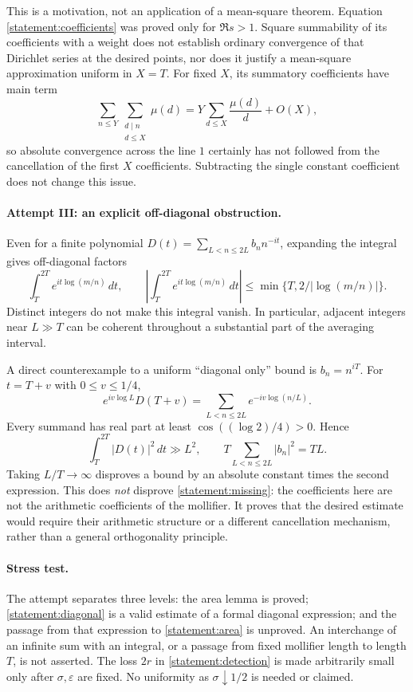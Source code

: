 \documentclass[11pt,a4paper]{article}
\numberwithin{equation}{section}
\begin{document}
This is a motivation, not an application of a mean-square theorem.
Equation \eqref{statement:coefficients} was proved only for $\Re s>1$.
Square summability of its coefficients with a weight does not establish
ordinary convergence of that Dirichlet series at the desired points,
nor does it justify a mean-square approximation uniform in $X=T$.
For fixed $X$, its summatory coefficients have main term
\[
 \sum_{n\leq Y}\sum_{\substack{d\mid n\\d\leq X}}\mu(d)
   =Y\sum_{d\leq X}\frac{\mu(d)}d+O(X),
\]
so absolute convergence across the line $1$ certainly has not followed
from the cancellation of the first $X$ coefficients.  Subtracting the
single constant coefficient does not change this issue.

\paragraph{Attempt III: an explicit off-diagonal obstruction.}
Even for a finite polynomial $D(t)=\sum_{L<n\leq2L}b_n n^{-it}$,
expanding the integral gives off-diagonal factors
\[
 \int_T^{2T}e^{it\log(m/n)}\,dt,
 \qquad
 \left|\int_T^{2T}e^{it\log(m/n)}\,dt\right|
 \leq\min\{T,2/|\log(m/n)|\}.
\]
Distinct integers do not make this integral vanish.  In particular,
adjacent integers near $L\gg T$ can be coherent throughout a substantial
part of the averaging interval.

A direct counterexample to a uniform ``diagonal only'' bound is
$b_n=n^{iT}$.  For $t=T+v$ with $0\leq v\leq1/4$,
\[
 e^{iv\log L}D(T+v)=\sum_{L<n\leq2L}e^{-iv\log(n/L)}.
\]
Every summand has real part at least $\cos((\log2)/4)>0$.  Hence
\[
 \int_T^{2T}|D(t)|^2\,dt\gg L^2,
 \qquad T\sum_{L<n\leq2L}|b_n|^2=TL.
\]
Taking $L/T\to\infty$ disproves a bound by an absolute constant times
the second expression.  This does \emph{not} disprove
\eqref{statement:missing}: the coefficients here are not the arithmetic
coefficients of the mollifier.  It proves that the desired estimate
would require their arithmetic structure or a different cancellation
mechanism, rather than a general orthogonality principle.

\paragraph{Stress test.}
The attempt separates three levels: the area lemma is proved;
\eqref{statement:diagonal} is a valid estimate of a formal diagonal expression;
and the passage from that expression to \eqref{statement:area} is unproved.
An interchange of an infinite sum with an integral, or a passage from
fixed mollifier length to length $T$, is not asserted.  The loss
$2r$ in \eqref{statement:detection} is made arbitrarily small only after
$\sigma,\varepsilon$ are fixed.  No uniformity as $\sigma\downarrow1/2$
is needed or claimed.
\end{document}
